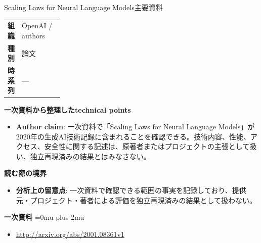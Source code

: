 \begin{technicalnote}{Scaling Laws for Neural Language Models}{主要資料}
\begingroup
\begin{tabularx}{\linewidth}{@{}>{\bfseries}p{0.22\linewidth}X@{}}
組織 & OpenAI / authors \\
種別 & 論文 \\
時系列 & — \\
\end{tabularx}
\smallskip
{\bfseries 一次資料から整理したtechnical points}
\begin{itemize}[leftmargin=1.5em,itemsep=0.35em]
\item \textbf{Author claim}: 一次資料で「Scaling Laws for Neural Language Models」が2020年の生成AI技術記録に含まれることを確認できる。技術内容、性能、アクセス、安全性に関する記述は、原著者またはプロジェクトの主張として扱い、独立再現済みの結果とはみなさない。
\end{itemize}
\begin{minipage}{\linewidth}
{\bfseries 読む際の境界}
\begin{itemize}[leftmargin=1.5em,itemsep=0.35em]
\item \textbf{分析上の留意点}: 一次資料で確認できる範囲の事実を記録しており、提供元・プロジェクト・著者による評価を独立再現済みの結果として扱わない。
\end{itemize}
\begin{samepage}
{\bfseries 一次資料}
\begingroup\sloppy
\Urlmuskip=0mu plus 2mu\relax
\begin{itemize}[leftmargin=1.5em,itemsep=0.25em]
\item {\scriptsize\url{http://arxiv.org/abs/2001.08361v1}}
\end{itemize}
\endgroup
\end{samepage}
\end{minipage}
\endgroup
\end{technicalnote}
\medskip

